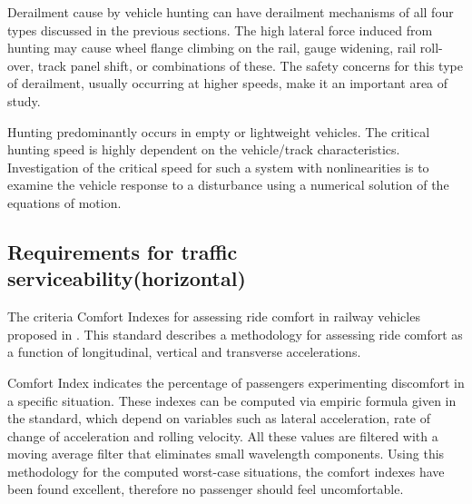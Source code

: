 Derailment cause by vehicle hunting can have derailment mechanisms of all four types discussed in the previous sections. The high lateral force induced from hunting may cause wheel flange climbing on the rail, gauge widening, rail roll-over, track panel shift, or combinations of these. The safety concerns for this type of derailment, usually occurring at higher speeds, make it an important area of study.

Hunting predominantly occurs in empty or lightweight vehicles. The critical hunting speed is highly dependent on the vehicle/track characteristics. Investigation of the critical speed for such a system with nonlinearities is to examine the vehicle response to a disturbance using a numerical solution of the equations of motion.

\subsection{Requirements for traffic serviceability(horizontal)}

The criteria Comfort Indexes for assessing ride comfort in railway vehicles proposed in \citet{12299}. This standard describes a methodology for assessing ride comfort as a function of longitudinal, vertical and transverse accelerations.

Comfort Index indicates the percentage of passengers experimenting discomfort in a specific situation. These indexes can be computed via empiric formula given in the standard, which depend on variables such as lateral acceleration, rate of change of acceleration and rolling velocity. All these values are filtered with a moving average filter that eliminates small wavelength components. Using this methodology for the computed worst-case situations, the comfort indexes have been found excellent, therefore no passenger should feel uncomfortable.



